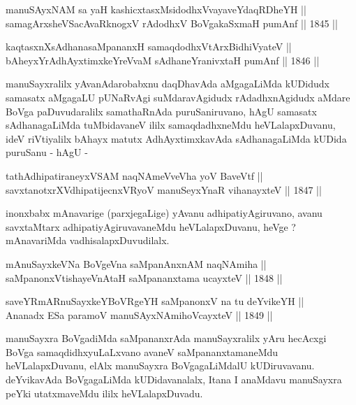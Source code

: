 
\begin{shl}
manuSAyxNAM sa yaH kashicxtasxMsidodhxV\s vayaveYdaqRDheYH || \\
samagArxsheVSacAvaRknogxV rAdodhxV BoVgakaSxmaH pumAnf \hfill || 1845 ||  
\end{shl}

\begin{shl}
kaqtasxnXsAdhanasaMpananxH samaqdodhxV\s tArxBidhiVyateV || \\
bAheyxYrAdhAyxtimxkeYreVvaM sAdhaneYranivxtaH pumAnf \hfill || 1846 ||  
\end{shl}

\begin{artha}
manuSayxralilx yAvanAdarobabxnu daqDhavAda aMgagaLiMda kUDidudx
samasatx aMgagaLU pUNaRvAgi suMdaravAgidudx rAdadhxnAgidudx aMdare
BoVga paDuvudaralilx samathaRnAda puruSaniruvano, hAgU
samasatx sAdhanagaLiMda tuMbidavaneV ililx samaqdadhxneMdu
heVLalapxDuvanu, ideV riVtiyalilx bAhayx matutx AdhAyxtimxkavAda
sAdhanagaLiMda kUDida puruSanu - hAgU -
\end{artha}

\begin{shl}
tathA\s dhipatiraneyxVSAM naqNAmeVveVha yoV BaveVtf || \\
savxtanotxrXV\s dhipatijecnxVRyoV manuSeyxYnaR vihanayxteV \hfill || 1847 ||  
\end{shl}

\begin{artha}
inonxbabx mAnavarige (parxjegaLige) yAvanu adhipatiyAgiruvano, avanu
savxtaMtarx adhipatiyAgiruvavaneMdu heVLalapxDuvanu, heVge ?
mAnavariMda vadhisalapxDuvudilalx.
\end{artha}


\begin{shl}
mAnuSayxkeVNa BoVgeVna saMpanAnxnAM naqNAmiha || \\
saMpanonxV\s tishayeVnAtaH saMpananxtama ucayxteV \hfill || 1848 ||  
\end{shl}

\begin{shl}
saveYRmARnuSayxkeYBoVRgeYH saMpanonxV na tu deYvikeYH || \\
Ananadx ESa paramoV manuSAyxNAmihoVcayxteV \hfill || 1849 ||  
\end{shl}

\begin{artha}
manuSayxra BoVgadiMda saMpananxrAda manuSayxralilx yAru hecAcxgi BoVga
samaqdidhxyuLaLxvano avaneV saMpananxtamaneMdu heVLalapxDuvanu, elAlx
manuSayxra BoVgagaLiMdalU kUDiruvavanu. deYvikavAda BoVgagaLiMda
kUDidavanalalx, Itana I anaMdavu manuSayxra peYki utatxmaveMdu ililx
heVLalapxDuvadu.
\end{artha}

